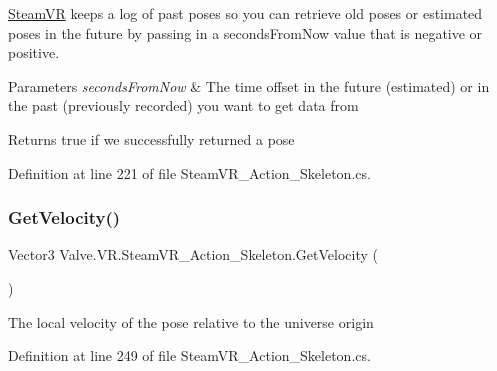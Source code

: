 \mbox{\hyperlink{class_valve_1_1_v_r_1_1_steam_v_r}{Steam\+VR}} keeps a log of past poses so you can retrieve old poses or estimated poses in the future by passing in a seconds\+From\+Now value that is negative or positive. 


\begin{DoxyParams}{Parameters}
{\em seconds\+From\+Now} & The time offset in the future (estimated) or in the past (previously recorded) you want to get data from\\
\hline
\end{DoxyParams}
\begin{DoxyReturn}{Returns}
true if we successfully returned a pose
\end{DoxyReturn}


Definition at line 221 of file Steam\+V\+R\+\_\+\+Action\+\_\+\+Skeleton.\+cs.

\mbox{\label{class_valve_1_1_v_r_1_1_steam_v_r___action___skeleton_a2081399c843bd653b32a04eb0944cb97}} 
\subsubsection{\texorpdfstring{GetVelocity()}{GetVelocity()}}
{\footnotesize\ttfamily Vector3 Valve.\+V\+R.\+Steam\+V\+R\+\_\+\+Action\+\_\+\+Skeleton.\+Get\+Velocity (\begin{DoxyParamCaption}{ }\end{DoxyParamCaption})}



The local velocity of the pose relative to the universe origin 



Definition at line 249 of file Steam\+V\+R\+\_\+\+Action\+\_\+\+Skeleton.\+cs.

\mbox{\label{class_valve_1_1_v_r_1_1_steam_v_r___action___skeleton_aefc772e4655cee6df2ac7794cab5c57b}} 
